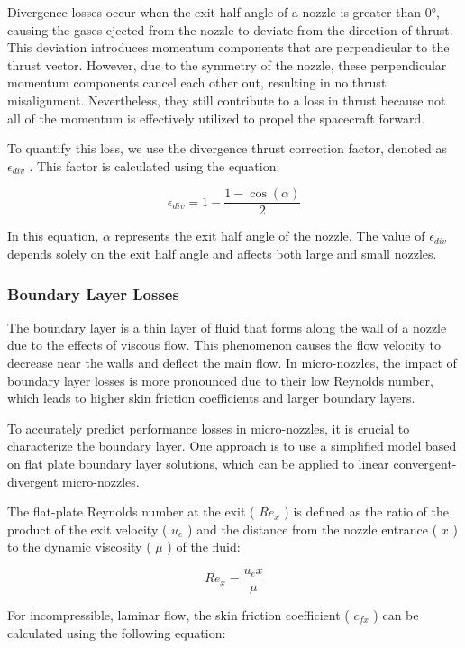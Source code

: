 \documentclass{homework}
\begin{document}
\begin{multicols}{2}
		  Divergence losses occur when the exit half angle of a nozzle is greater than 0°, causing the gases ejected from the nozzle to deviate from the direction of thrust. This deviation introduces momentum components that are perpendicular to the thrust vector. However, due to the symmetry of the nozzle, these perpendicular momentum components cancel each other out, resulting in no thrust misalignment. Nevertheless, they still contribute to a loss in thrust because not all of the momentum is effectively utilized to propel the spacecraft forward.  
		    
		  To quantify this loss, we use the divergence thrust correction factor, denoted as $\epsilon_{div}$ . This factor is calculated using the equation:  
		    
		  $$\epsilon_{div} = 1 - \frac{1 - \cos(\alpha)}{2}$$  
		    
		  In this equation, $\alpha$ represents the exit half angle of the nozzle. The value of $\epsilon_{div}$ depends solely on the exit half angle and affects both large and small nozzles.  
\subsubsection{Boundary Layer Losses}
		    
		  The boundary layer is a thin layer of fluid that forms along the wall of a nozzle due to the effects of viscous flow. This phenomenon causes the flow velocity to decrease near the walls and deflect the main flow. In micro-nozzles, the impact of boundary layer losses is more pronounced due to their low Reynolds number, which leads to higher skin friction coefficients and larger boundary layers.  
		    
		  To accurately predict performance losses in micro-nozzles, it is crucial to characterize the boundary layer. One approach is to use a simplified model based on flat plate boundary layer solutions, which can be applied to linear convergent-divergent micro-nozzles.  
		    
		  The flat-plate Reynolds number at the exit ( $R e_x$ ) is defined as the ratio of the product of the exit velocity ( $u_e$ ) and the distance from the nozzle entrance ( $x$ ) to the dynamic viscosity ( $\mu$ ) of the fluid:  
		    
		  $$R e_x=\frac{u_e x}{\mu}$$  
		    
		  For incompressible, laminar flow, the skin friction coefficient ( $c_{f x}$ ) can be calculated using the following equation:  
		    

\end{multicols}
\end{document}
